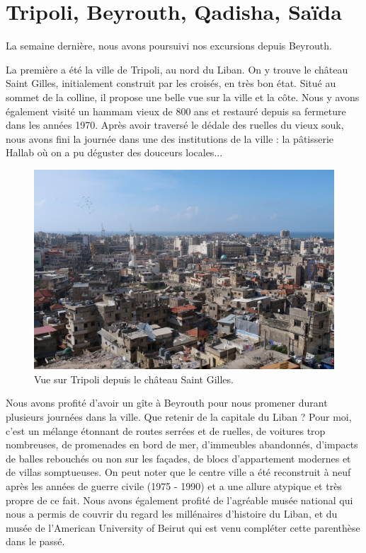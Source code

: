 \hypertarget{tripoli-beyrouth-qadisha-sauxefda}{%
\section{Tripoli, Beyrouth, Qadisha,
Saïda}\label{tripoli-beyrouth-qadisha-sauxefda}}

\hypertarget{mapid}{}

La semaine dernière, nous avons poursuivi nos excursions depuis
Beyrouth.

La première a été la ville de Tripoli, au nord du Liban. On y trouve le
château Saint Gilles, initialement construit par les croisés, en très
bon état. Situé au sommet de la colline, il propose une belle vue sur la
ville et la côte. Nous y avons également visité un hammam vieux de 800
ans et restauré depuis sa fermeture dans les années 1970. Après avoir
traversé le dédale des ruelles du vieux souk, nous avons fini la journée
dans une des institutions de la ville : la pâtisserie Hallab où on a pu
déguster des douceurs locales...

\begin{figure}
\centering
\includegraphics{images/20180521_tripoli.JPG}
\caption{Vue sur Tripoli depuis le château Saint Gilles.}
\end{figure}

Nous avons profité d'avoir un gîte à Beyrouth pour nous promener durant
plusieurs journées dans la ville. Que retenir de la capitale du Liban ?
Pour moi, c'est un mélange étonnant de routes serrées et de ruelles, de
voitures trop nombreuses, de promenades en bord de mer, d'immeubles
abandonnés, d'impacts de balles rebouchés ou non sur les façades, de
blocs d'appartement modernes et de villas somptueuses. On peut noter que
le centre ville a été reconstruit à neuf après les années de guerre
civile (1975 - 1990) et a une allure atypique et très propre de ce fait.
Nous avons également profité de l'agréable musée national qui nous a
permis de couvrir du regard les millénaires d'histoire du Liban, et du
musée de l'American University of Beirut qui est venu compléter cette
parenthèse dans le passé.

